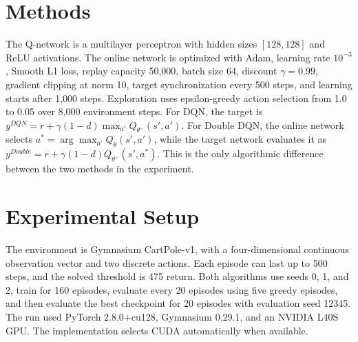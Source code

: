 \documentclass{article}
\begin{document}
\section{Methods} The Q-network is a multilayer perceptron with hidden sizes $[128,128]$ and ReLU activations. The online network is optimized with Adam, learning rate $10^{-3}$, Smooth L1 loss, replay capacity 50,000, batch size 64, discount $\gamma=0.99$, gradient clipping at norm 10, target synchronization every 500 steps, and learning starts after 1,000 steps. Exploration uses epsilon-greedy action selection from 1.0 to 0.05 over 8,000 environment steps.
For DQN, the target is $y^{DQN}=r+\gamma(1-d)\max_{a'}Q_{\theta^-}(s',a')$. For Double DQN, the online network selects $a^*=\arg\max_{a'}Q_{\theta}(s',a')$, while the target network evaluates it as $y^{Double}=r+\gamma(1-d)Q_{\theta^-}(s',a^*)$. This is the only algorithmic difference between the two methods in the experiment.
\section{Experimental Setup} The environment is Gymnasium CartPole-v1, with a four-dimensional continuous observation vector and two discrete actions. Each episode can last up to 500 steps, and the solved threshold is 475 return. Both algorithms use seeds 0, 1, and 2, train for 160 episodes, evaluate every 20 episodes using five greedy episodes, and then evaluate the best checkpoint for 20 episodes with evaluation seed 12345. The run used PyTorch 2.8.0+cu128, Gymnasium 0.29.1, and an NVIDIA L40S GPU. The implementation selects CUDA automatically when available.
\end{document}
